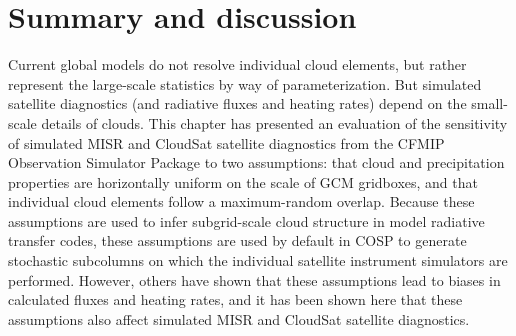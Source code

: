 \section{Summary and discussion} Current global models do not resolve individual cloud elements, but rather represent the large-scale statistics by way of parameterization. But simulated satellite diagnostics (and radiative fluxes and heating rates) depend on the small-scale details of clouds. This chapter has presented an evaluation of the sensitivity of simulated MISR and CloudSat satellite diagnostics from the CFMIP Observation Simulator Package to two assumptions: that cloud and precipitation properties are horizontally uniform on the scale of GCM gridboxes, and that individual cloud elements follow a maximum-random overlap. Because these assumptions are used to infer subgrid-scale cloud structure in model radiative transfer codes, these assumptions are used by default in COSP to generate stochastic subcolumns on which the individual satellite instrument simulators are performed. However, others have shown that these assumptions lead to biases in calculated fluxes and heating rates, and it has been shown here that these assumptions also affect simulated MISR and CloudSat satellite diagnostics.  

